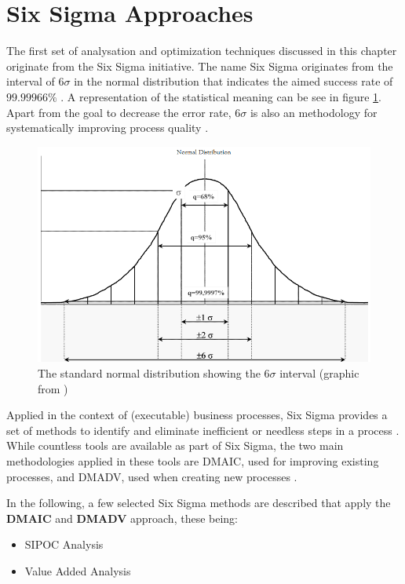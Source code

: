 


\section{Six Sigma Approaches}
The first set of analysation and optimization techniques discussed in this chapter originate from the Six Sigma initiative. The name Six Sigma originates from the interval of $6\sigma$ in the normal distribution that indicates the aimed success rate of $99.99966\%$ \cite{siha2008business}\cite{vivekananthamoorthy2011lean} . A representation of the statistical meaning can be see in figure \ref{fig:six-sigma}. Apart from the goal to decrease the error rate, $6\sigma$ is also an methodology for systematically improving process quality \cite{tennant2017six}.

\begin{figure}[H]
		\centering
		\includegraphics[width=0.7\columnwidth]{graphics/six-sigma}
		\caption{The standard normal distribution showing the $6\sigma$ interval (graphic from \cite{vivekananthamoorthy2011lean})} 
		\label{fig:six-sigma} 
\end{figure}

Applied in the context of (executable) business processes, Six Sigma provides a set of methods to identify and eliminate inefficient or needless steps in a process \cite{vom2014handbook}. While countless tools are available as part of Six Sigma, the two main methodologies applied in these tools are \gls{DMAIC}, used for improving existing processes, and \gls{DMADV}, used when creating new processes \cite{selvi2014six} .


In the following, a few selected Six Sigma methods are described that apply the \textbf{DMAIC} and  \textbf{DMADV} approach, these being:  
\begin{itemize}
	\item SIPOC Analysis
	\item Value Added Analysis
\end{itemize}

